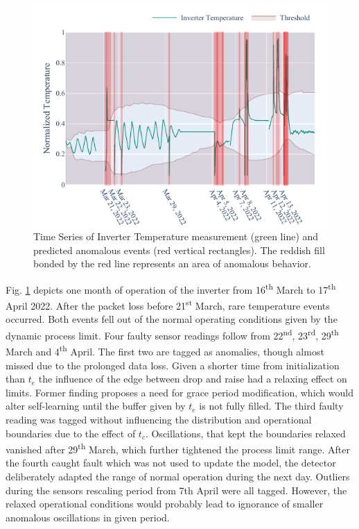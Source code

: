 \begin{figure}[htbp]
\centerline{\includegraphics{figures/Inverter_Temperature_168_hours_sliding_thresh.pdf}}
\caption{Time Series of Inverter Temperature measurement (green line) and predicted anomalous events (red vertical rectangles). The reddish fill bonded by the red line represents an area of anomalous behavior.}
\label{fig:cs2_threshold}
\end{figure}

Fig. \ref{fig:cs2_threshold} depicts one month of operation of the inverter from 16\textsuperscript{th} March to 17\textsuperscript{th} April 2022. After the packet loss before 21\textsuperscript{st} March, rare temperature events occurred. Both events fell out of the normal operating conditions given by the dynamic process limit. Four faulty sensor readings follow from 22\textsuperscript{nd}, 23\textsuperscript{rd}, 29\textsuperscript{th} March and 4\textsuperscript{th} April. The first two are tagged as anomalies, though almost missed due to the prolonged data loss. Given a shorter time from initialization than $t_e$ the influence of the edge between drop and raise had a relaxing effect on limits. Former finding proposes a need for grace period modification, which would alter self-learning until the buffer given by $t_e$ is not fully filled. The third faulty reading was tagged without influencing the distribution and operational boundaries due to the effect of $t_c$. Oscillations, that kept the boundaries relaxed vanished after 29\textsuperscript{th} March, which further tightened the process limit range. After the fourth caught fault which was not used to update the model, the detector deliberately adapted the range of normal operation during the next day. Outliers during the sensors rescaling period from 7th April were all tagged. However, the relaxed operational conditions would probably lead to ignorance of smaller anomalous oscillations in given period.
